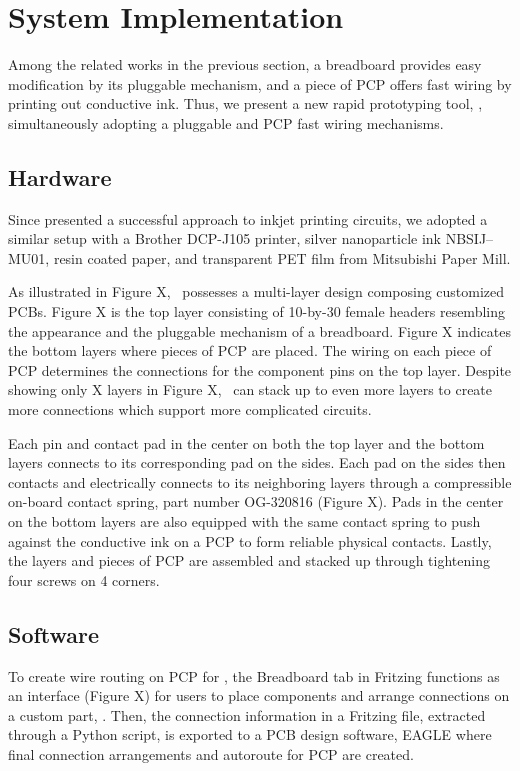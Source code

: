 \section{System Implementation}

Among the related works in the previous section, a breadboard provides easy modification by its pluggable mechanism, and a piece of PCP offers fast wiring by printing out conductive ink. Thus, we present a new rapid prototyping tool, \papertitle, simultaneously adopting a pluggable and PCP fast wiring mechanisms.

\subsection{Hardware}

Since \cite{Instant_Inkjet_Circuits} presented a successful approach to inkjet printing circuits, we adopted a similar setup with a Brother DCP-J105 printer, silver nanoparticle ink NBSIJ--MU01, resin coated paper, and transparent PET film from Mitsubishi Paper Mill.

As illustrated in Figure X, \papertitle\ possesses a multi-layer design composing customized PCBs. Figure X is the top layer consisting of 10-by-30 female headers resembling the appearance and the pluggable mechanism of a breadboard. Figure X indicates the bottom layers where pieces of PCP are placed. The wiring on each piece of PCP determines the connections for the component pins on the top layer. Despite showing only X layers in Figure X, \papertitle\ can stack up to even more layers to create more connections which support more complicated circuits.

Each pin and contact pad in the center on both the top layer and the bottom layers connects to its corresponding pad on the sides. Each pad on the sides then contacts and electrically connects to its neighboring layers through a compressible on-board contact spring, part number OG-320816 (Figure X). Pads in the center on the bottom layers are also equipped with the same contact spring to push against the conductive ink on a PCP to form reliable physical contacts. Lastly, the layers and pieces of PCP are assembled and stacked up through tightening four screws on 4 corners.

\subsection{Software}

To create wire routing on PCP for \papertitle, the Breadboard tab in Fritzing \cite{Fritzing} functions as an interface (Figure X) for users to place components and arrange connections on a custom part, \papertitle. Then, the connection information in a Fritzing file, extracted through a Python script, is exported to a PCB design software, EAGLE \cite{EAGLE} where final connection arrangements and autoroute for PCP are created.


